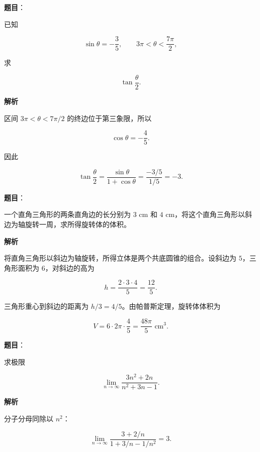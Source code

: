 \begin{answer}

\textbf{题目}：

已知

\nopagebreak[4]
\[
\sin\theta=-\frac35,\qquad
3\pi<\theta<\frac{7\pi}{2},
\]

求

\nopagebreak[4]
\[
\tan\frac\theta2.
\]

\textbf{解析}

区间 $3\pi<\theta<7\pi/2$ 的终边位于第三象限，所以

\nopagebreak[4]
\[
\cos\theta=-\frac45.
\]

因此

\nopagebreak[4]
\[
\tan\frac\theta2
=\frac{\sin\theta}{1+\cos\theta}
=\frac{-3/5}{1/5}=-3.
\]


\end{answer}
\begin{answer}

\textbf{题目}：

一个直角三角形的两条直角边的长分别为 $3\text{ cm}$ 和 $4\text{ cm}$，将这个直角三角形以斜边为轴旋转一周，求所得旋转体的体积。

\textbf{解析}

将直角三角形以斜边为轴旋转，所得立体是两个共底圆锥的组合。设斜边为 $5$，三角形面积为 $6$，对斜边的高为

\nopagebreak[4]
\[
h=\frac{2\cdot3\cdot4}{5}=\frac{12}{5}.
\]

三角形重心到斜边的距离为 $h/3=4/5$。由帕普斯定理，旋转体体积为

\nopagebreak[4]
\[
V=6\cdot2\pi\cdot\frac45
=\frac{48\pi}{5}\text{ cm}^3.
\]


\end{answer}
\begin{answer}

\textbf{题目}：

求极限

\nopagebreak[4]
\[
\lim_{n\to\infty}\frac{3n^2+2n}{n^2+3n-1}.
\]

\textbf{解析}

分子分母同除以 $n^2$：

\nopagebreak[4]
\[
\lim_{n\to\infty}\frac{3+2/n}{1+3/n-1/n^2}=3.
\]


\end{answer}
